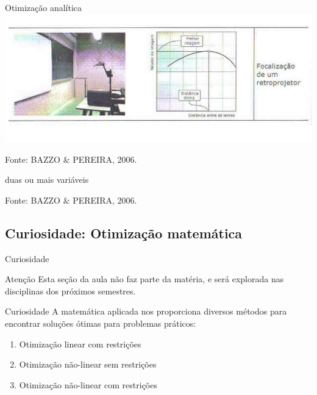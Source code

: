 \documentclass{beamer}
\begin{document}
\begin{frame}{Otimização analítica}
  \centering
  \includegraphics[width=1.1\textwidth]{otimizacao/1var}

\vfill
Fonte: BAZZO \& PEREIRA, 2006.
\end{frame}

\begin{frame}
  \begin{block}{duas ou mais variáveis}

  \end{block}

\vfill
Fonte: BAZZO \& PEREIRA, 2006.
\end{frame}

\begin{frame}

\end{frame}

\subsection[Curiosidade]{Curiosidade: Otimização matemática}

\begin{frame}{Curiosidade}
  \begin{block}{Atenção}
    Esta seção da aula não faz parte da matéria, e será explorada nas disciplinas dos próximos semestres.
  \end{block}
\end{frame}

\begin{frame}{Curiosidade}
A matemática aplicada nos proporciona diversos métodos para encontrar soluções ótimas para problemas práticos:

  \begin{enumerate}
  \item<2-> Otimização linear com restrições
  \item<3-> Otimização não-linear sem restrições
  \item<4-> Otimização não-linear com restrições
  \end{enumerate}
\end{frame}
\end{document}
